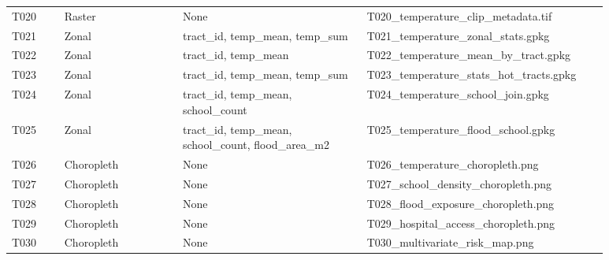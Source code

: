 \begin{longtable}{p{0.08\linewidth}p{0.18\linewidth}p{0.28\linewidth}p{0.34\linewidth}}
T020 & Raster & None & T020\_temperature\_clip\_metadata.tif \\
T021 & Zonal & tract\_id, temp\_mean, temp\_sum & T021\_temperature\_zonal\_stats.gpkg \\
T022 & Zonal & tract\_id, temp\_mean & T022\_temperature\_mean\_by\_tract.gpkg \\
T023 & Zonal & tract\_id, temp\_mean, temp\_sum & T023\_temperature\_stats\_hot\_tracts.gpkg \\
T024 & Zonal & tract\_id, temp\_mean, school\_count & T024\_temperature\_school\_join.gpkg \\
T025 & Zonal & tract\_id, temp\_mean, school\_count, flood\_area\_m2 & T025\_temperature\_flood\_school.gpkg \\
T026 & Choropleth & None & T026\_temperature\_choropleth.png \\
T027 & Choropleth & None & T027\_school\_density\_choropleth.png \\
T028 & Choropleth & None & T028\_flood\_exposure\_choropleth.png \\
T029 & Choropleth & None & T029\_hospital\_access\_choropleth.png \\
T030 & Choropleth & None & T030\_multivariate\_risk\_map.png \\
\bottomrule
\end{longtable}
